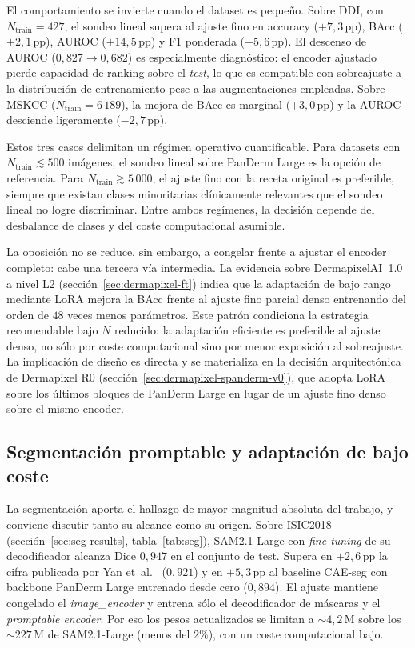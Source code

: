 El comportamiento se invierte cuando el dataset es pequeño. Sobre
DDI, con $N_{\mathrm{train}} = 427$, el sondeo lineal supera al
ajuste fino en accuracy ($+7{,}3$\,pp), BAcc ($+2{,}1$\,pp),
AUROC ($+14{,}5$\,pp) y F1 ponderada ($+5{,}6$\,pp). El
descenso de AUROC ($0{,}827 \to 0{,}682$) es especialmente
diagnóstico: el encoder ajustado pierde capacidad de ranking sobre
el \emph{test}, lo que es compatible con sobreajuste a la
distribución de entrenamiento pese a las augmentaciones empleadas.
Sobre MSKCC ($N_{\mathrm{train}} = 6\,189$), la mejora de BAcc es
marginal ($+3{,}0$\,pp) y la AUROC desciende ligeramente
($-2{,}7$\,pp).

Estos tres casos delimitan un régimen operativo cuantificable. Para
datasets con $N_{\mathrm{train}} \lesssim 500$ imágenes, el sondeo
lineal sobre PanDerm Large es la opción de referencia. Para
$N_{\mathrm{train}} \gtrsim 5\,000$, el ajuste fino con la receta
original es preferible, siempre que existan clases minoritarias
clínicamente relevantes que el sondeo lineal no logre discriminar.
Entre ambos regímenes, la decisión depende del desbalance de clases
y del coste computacional asumible.

La oposición no se reduce, sin embargo, a congelar frente a ajustar el
encoder completo: cabe una tercera vía intermedia. La evidencia sobre
DermapixelAI~1.0 a nivel L2 (sección~\ref{sec:dermapixel-ft})
indica que la adaptación de bajo rango mediante LoRA mejora la BAcc frente
al ajuste fino parcial denso entrenando del orden de $48$ veces menos
parámetros. Este patrón condiciona la estrategia recomendable bajo $N$
reducido: la adaptación eficiente es preferible al ajuste denso, no sólo
por coste computacional sino por menor exposición al sobreajuste. La
implicación de diseño es directa y se materializa en la decisión
arquitectónica de Dermapixel R0 (sección~\ref{sec:dermapixel-spanderm-v0}),
que adopta LoRA sobre los últimos bloques de PanDerm Large en lugar de un
ajuste fino denso sobre el mismo encoder.

\subsection{Segmentación promptable y adaptación de bajo coste}
\label{sec:disc-segmentacion}

La segmentación aporta el hallazgo de mayor magnitud absoluta del
trabajo, y conviene discutir tanto su alcance como su origen. Sobre
ISIC2018 (sección~\ref{sec:seg-results}, tabla~\ref{tab:seg}),
SAM2.1-Large con \emph{fine-tuning} de su decodificador alcanza
Dice $0{,}947$ en el conjunto de test. Supera en $+2{,}6$\,pp la
cifra publicada por Yan et~al.~\cite{panderm2025} ($0{,}921$) y
en $+5{,}3$\,pp al baseline CAE-seg con backbone PanDerm Large
entrenado desde cero ($0{,}894$). El ajuste mantiene congelado el
\emph{image\_encoder} y entrena sólo el decodificador de máscaras y
el \emph{promptable encoder}. Por eso los pesos actualizados se
limitan a $\sim 4{,}2$\,M sobre los $\sim 227$\,M de
SAM2.1-Large (menos del $2\%$), con un coste computacional bajo.

